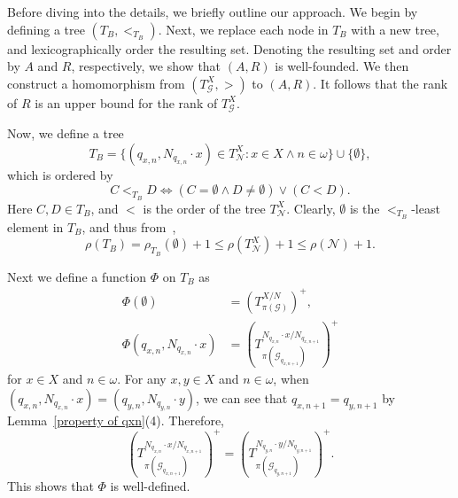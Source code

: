 \documentclass[11pt]{amsart}
\theoremstyle{definition}
\theoremstyle{remark}
\numberwithin{equation}{section}
\def\otr#1#2{T_{\mathcal{#1}}^{#2}}
\begin{document}
Before diving into the details, we briefly outline our approach. We begin by defining a tree $(T_B,<_{T_B})$. Next, we replace each node in $T_B$ with a new tree, and lexicographically order the resulting set. Denoting the resulting set and order by $A$ and $R$, respectively, we show that $(A,R)$ is well-founded. We then construct a homomorphism from $(\otr{G}{X},>)$ to $(A,R)$. It follows that the rank of $R$ is an upper bound for the rank of $\otr{G}{X}$.

Now, we define a tree
$$T_B=\{(q_{x,n},N_{q_{x,n}}\cdot x)\in \otr{N}{X}:x\in X\land n\in\omega\}\cup\{\emptyset\},$$
which is ordered by
$$C<_{T_B}D\iff(C=\emptyset\land D\neq\emptyset)\lor(C<D).$$
Here $C,D\in T_B$, and $<$ is the order of the tree $\otr{N}{X}$. Clearly, $\emptyset$ is the $<_{T_B}$-least element in $T_B$, and thus from~\cite[Corollary 3.12]{DingW},
$$\rho(T_B)=\rho_{T_B}(\emptyset)+1\le\rho(\otr{N}{X})+1\le\rho(\mathcal N)+1.$$

Next we define a function $\Phi$ on $T_B$ as
\begin{align*}
    \Phi(\emptyset)&=(T_{\pi(\mathcal{G})}^{X/N})^+,\\
    \Phi(q_{x,n},N_{q_{x,n}}\cdot x)&=(T_{\pi(\mathcal{G}_{q_{x,n+1}})}^{N_{q_{x,n}}\cdot x/N_{q_{x,n+1}}})^+
\end{align*}
for $x\in X$ and $n\in\omega$. For any $x,y\in X$ and $n\in\omega$, when $(q_{x,n},N_{q_{x,n}}\cdot x)=(q_{y,n},N_{q_{y,n}}\cdot y)$,  we can see that $q_{x,n+1}=q_{y,n+1}$ by Lemma~\ref{property of qxn}(4). Therefore,
$$(T_{\pi(\mathcal{G}_{q_{x,n+1}})}^{N_{q_{x,n}}\cdot x/N_{q_{x,n+1}}})^+=(T_{\pi(\mathcal{G}_{q_{y,n+1}})}^{N_{q_{y,n}}\cdot y/N_{q_{y,n+1}}})^+.$$
This shows that $\Phi$ is well-defined.
\end{document}
